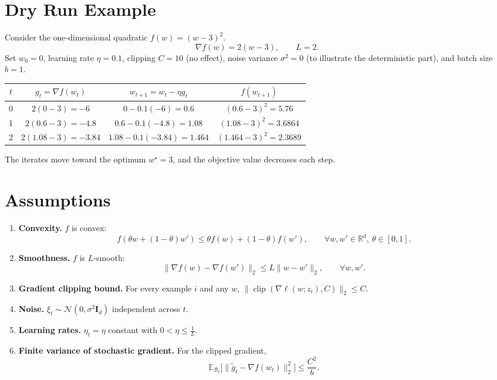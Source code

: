 \documentclass{article}
\newcommand{\E}{\mathbb{E}}
\newcommand{\R}{\mathbb{R}}
\begin{document}
\section*{Dry Run Example}
Consider the one‑dimensional quadratic $f(w)=(w-3)^2$.
\[
\nabla f(w)=2(w-3),\qquad L=2.
\]
Set $w_0=0$, learning rate $\eta=0.1$, clipping $C=10$ (no effect), noise variance $\sigma^2=0$ (to illustrate the deterministic part), and batch size $b=1$.

\begin{center}
\begin{tabular}{c|c|c|c}
$t$ & $g_t=\nabla f(w_t)$ & $w_{t+1}=w_t-\eta g_t$ & $f(w_{t+1})$ \\ \hline
0 & $2(0-3)=-6$ & $0-0.1(-6)=0.6$ & $(0.6-3)^2=5.76$ \\
1 & $2(0.6-3)=-4.8$ & $0.6-0.1(-4.8)=1.08$ & $(1.08-3)^2=3.6864$ \\
2 & $2(1.08-3)=-3.84$ & $1.08-0.1(-3.84)=1.464$ & $(1.464-3)^2=2.3689$
\end{tabular}
\end{center}
The iterates move toward the optimum $w^\star=3$, and the objective value decreases each step.

\section*{Assumptions}
\begin{enumerate}
\item \textbf{Convexity.} $f$ is convex:
\[
f(\theta w+(1-\theta)w')\le \theta f(w)+(1-\theta)f(w'),\qquad\forall w,w'\in\R^d,\ \theta\in[0,1].
\]
\item \textbf{Smoothness.} $f$ is $L$‑smooth:
\[
\|\nabla f(w)-\nabla f(w')\|_2\le L\|w-w'\|_2,\qquad\forall w,w'.
\]
\item \textbf{Gradient clipping bound.} For every example $i$ and any $w$, $\|\operatorname{clip}(\nabla\ell(w;z_i),C)\|_2\le C$.
\item \textbf{Noise.} $\xi_t\sim\mathcal{N}(0,\sigma^2\mathbf{I}_d)$ independent across $t$.
\item \textbf{Learning rates.} $\eta_t=\eta$ constant with $0<\eta\le \frac{1}{L}$.
\item \textbf{Finite variance of stochastic gradient.} For the clipped gradient,
\[
\E_{\mathcal{B}_t}\big[\|\tilde{g}_t-\nabla f(w_t)\|_2^2\big]\le \frac{C^2}{b}.
\]
\end{enumerate}
\end{document}
